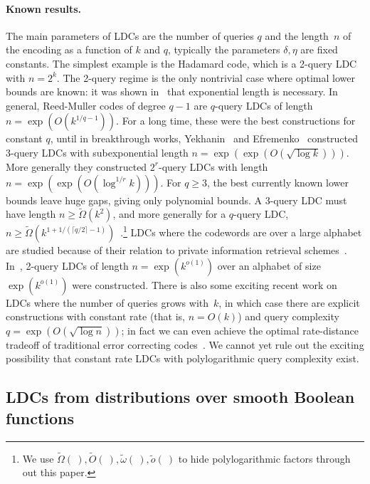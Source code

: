 \documentclass[11pt]{article}
\numberwithin{equation}{section}
\theoremstyle{definition}
\theoremstyle{plain}
\newcommand{\ceil}[1]{\lceil{#1}\rceil}
\begin{document}
\paragraph{Known results.}
The main parameters of LDCs are the number of queries $q$ and the length~$n$ of the encoding %
 as a function of $k$ and $q$, typically the parameters $\delta,\eta$ are fixed constants. The simplest example is the Hadamard code, which is a 2-query LDC with $n=2^k$. The 2-query regime is the only nontrivial case where optimal lower bounds are known: it was shown in~\cite{Kerenidis:2004,GKST02} that exponential length is necessary. In general, Reed-Muller codes of degree $q-1$ are $q$-query LDCs of length $n=\exp(O(k^{1/q-1}))$. For a long time, these were the best constructions for constant $q$, until in breakthrough works, Yekhanin~\cite{Yekhanin:2007} and Efremenko~\cite{Efremenko:2009} constructed $3$-query LDCs with subexponential length $n=\exp(\exp(O(\sqrt{\log k})))$. More generally they constructed $2^r$-query LDCs with length $n=\exp(\exp(O(\log^{1/r} k)))$. For $q\geq 3$, the best currently known lower bounds leave huge gaps, giving only polynomial bounds. A $3$-query LDC must have length $n\ge \tilde{\Omega}(k^2)$, and more generally for a $q$-query LDC, $n\ge \tilde{\Omega}(k^{1+1/(\ceil{q/2}-1)})$~\cite{Kerenidis:2004,Woodruff:2007a}.\footnote{We use $\tilde{\Omega}(\ ), \tilde{O}(\ ), \tilde{\omega}(\ ), \tilde{o}(\ )$ to hide polylogarithmic factors through out this paper.} LDCs where the codewords are over a large alphabet are studied because of their relation to private information retrieval schemes~\cite{CKGS98,Katz:2000}. In~\cite{DG15}, 2-query LDCs of length $n=\exp(k^{o(1)})$ over an alphabet of size $\exp(k^{o(1)})$ were constructed.
There is also some exciting recent work on LDCs where the number of queries grows with~$k$, in which case there are explicit constructions with constant rate (that is, $n = O(k)$)  and query complexity $q=\exp(O(\sqrt{\log n}))$; in fact we can even achieve the optimal rate-distance tradeoff of traditional error correcting codes~\cite{KSY10,KMRS16,GKORS16}. We cannot yet rule out the exciting possibility that constant rate LDCs with polylogarithmic query complexity exist.


%
\subsection{LDCs from distributions over smooth Boolean functions}
\end{document}
